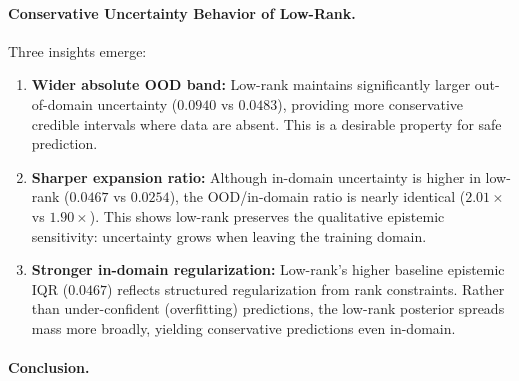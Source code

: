 \documentclass{article}
\theoremstyle{plain}
\theoremstyle{definition}
\theoremstyle{remark}
\begin{document}
\paragraph{Conservative Uncertainty Behavior of Low-Rank.}

Three insights emerge:

\begin{enumerate}
\item \textbf{Wider absolute OOD band:} Low-rank maintains significantly larger out-of-domain uncertainty 
  ($0.0940$ vs $0.0483$), providing more conservative credible intervals where data are absent. 
  This is a desirable property for safe prediction.

\item \textbf{Sharper expansion ratio:} Although in-domain uncertainty is higher in low-rank ($0.0467$ vs $0.0254$), 
  the OOD/in-domain ratio is nearly identical ($2.01\times$ vs $1.90\times$). 
  This shows low-rank preserves the qualitative epistemic sensitivity: uncertainty grows when leaving the training domain.

\item \textbf{Stronger in-domain regularization:} Low-rank's higher baseline epistemic IQR ($0.0467$) 
  reflects structured regularization from rank constraints. Rather than under-confident (overfitting) predictions, 
  the low-rank posterior spreads mass more broadly, yielding conservative predictions even in-domain.
\end{enumerate}

\paragraph{Conclusion.}
\end{document}
